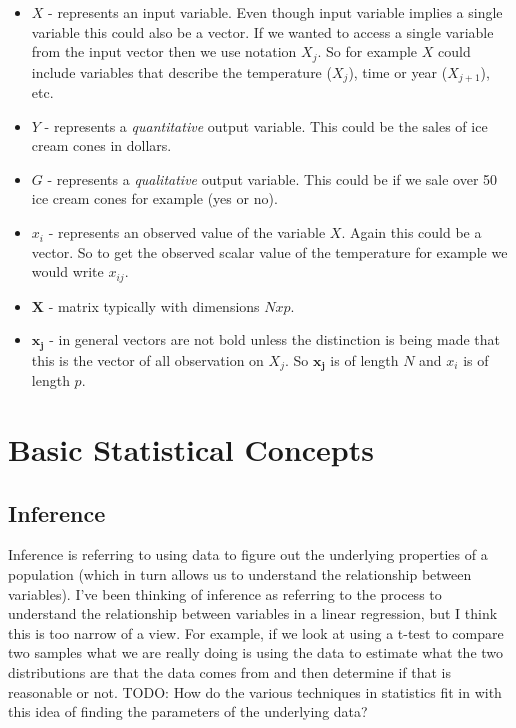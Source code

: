 \documentclass[paper=a4, fontsize=11pt]{scrartcl} %
\numberwithin{equation}{section} %
\numberwithin{figure}{section} %
\numberwithin{table}{section} %
\begin{document}
\begin{itemize}
\item $X$ - represents an input variable. Even though input variable implies a single variable this could also be a vector. If we wanted to access a single variable from the input vector then we use notation $X_j$. So for example $X$ could include variables that describe the temperature ($X_{j}$), time or year ($X_{j+1}$), etc. 
\item $Y$ - represents a \emph{quantitative} output variable. This could be the sales of ice cream cones in dollars.
\item $G$ - represents a \emph{qualitative} output variable. This could be if we sale over 50 ice cream cones for example (yes or no). 
\item $x_i$ - represents an observed value of the variable $X$. Again this could be a vector. So to get the observed scalar value of the temperature for example we would write $x_{ij}$. 
\item $\bm{X}$ - matrix typically with dimensions $Nxp$. 
\item $\bm{x_j}$ -  in general vectors are not bold unless the distinction is being made that this is the vector of all observation on $X_j$. So $\bm{x_j}$ is of length $N$ and $x_i$ is of length $p$.
\end{itemize}


\section{Basic Statistical Concepts}

\subsection{Inference}

Inference is referring to using data to figure out the underlying properties of a population (which in turn allows us to understand the relationship between variables). I've been thinking of inference as referring to the process to understand the relationship between variables in a linear regression, but I think this is too narrow of a view. For example, if we look at using a t-test to compare two samples what we are really doing is using the data to estimate what the two distributions are that the data comes from and then determine if that is reasonable or not. TODO: How do the various techniques in statistics fit in with this idea of finding the parameters of the underlying data?


\clearpage
\printglossaries
\end{document}
